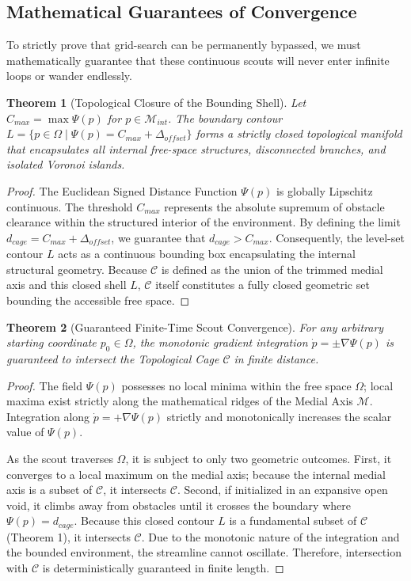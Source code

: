 \documentclass[letterpaper, 10 pt, conference]{IEEEtran}
\newtheorem{theorem}{Theorem}
\begin{document}
\subsection{Mathematical Guarantees of Convergence}
To strictly prove that grid-search can be permanently bypassed, we must mathematically guarantee that these continuous scouts will never enter infinite loops or wander endlessly.

\begin{theorem}[Topological Closure of the Bounding Shell]
Let $C_{max} = \max \Psi(p)$ for $p \in \mathcal{M}_{int}$. The boundary contour $L = \{p \in \Omega \mid \Psi(p) = C_{max} + \Delta_{offset}\}$ forms a strictly closed topological manifold that encapsulates all internal free-space structures, disconnected branches, and isolated Voronoi islands.
\end{theorem}
\begin{proof}
The Euclidean Signed Distance Function $\Psi(p)$ is globally Lipschitz continuous. The threshold $C_{max}$ represents the absolute supremum of obstacle clearance within the structured interior of the environment. By defining the limit $d_{cage} = C_{max} + \Delta_{offset}$, we guarantee that $d_{cage} > C_{max}$. Consequently, the level-set contour $L$ acts as a continuous bounding box encapsulating the internal structural geometry. Because $\mathcal{C}$ is defined as the union of the trimmed medial axis and this closed shell $L$, $\mathcal{C}$ itself constitutes a fully closed geometric set bounding the accessible free space.
\end{proof}

\begin{theorem}[Guaranteed Finite-Time Scout Convergence]
For any arbitrary starting coordinate $p_0 \in \Omega$, the monotonic gradient integration $\dot{p} = \pm \nabla\Psi(p)$ is guaranteed to intersect the Topological Cage $\mathcal{C}$ in finite distance.
\end{theorem}
\begin{proof}
The field $\Psi(p)$ possesses no local minima within the free space $\Omega$; local maxima exist strictly along the mathematical ridges of the Medial Axis $\mathcal{M}$. Integration along $\dot{p} = +\nabla\Psi(p)$ strictly and monotonically increases the scalar value of $\Psi(p)$. 

As the scout traverses $\Omega$, it is subject to only two geometric outcomes. First, it converges to a local maximum on the medial axis; because the internal medial axis is a subset of $\mathcal{C}$, it intersects $\mathcal{C}$. Second, if initialized in an expansive open void, it climbs away from obstacles until it crosses the boundary where $\Psi(p) = d_{cage}$. Because this closed contour $L$ is a fundamental subset of $\mathcal{C}$ (Theorem 1), it intersects $\mathcal{C}$. Due to the monotonic nature of the integration and the bounded environment, the streamline cannot oscillate. Therefore, intersection with $\mathcal{C}$ is deterministically guaranteed in finite length.
\end{proof}
\end{document}

